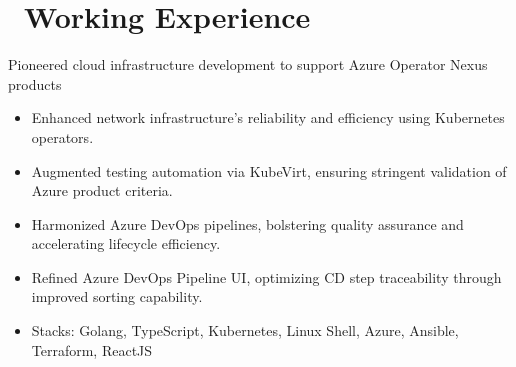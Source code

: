\documentclass{resume}
\begin{document}
\section{\faUsers\ Working Experience}
Pioneered cloud infrastructure development to support Azure Operator Nexus products
\begin{itemize}
  \item Enhanced network infrastructure's reliability and efficiency using Kubernetes operators.
  \item Augmented testing automation via KubeVirt, ensuring stringent validation of Azure product criteria.
  \item Harmonized Azure DevOps pipelines, bolstering quality assurance and accelerating lifecycle efficiency.
  \item Refined Azure DevOps Pipeline UI, optimizing CD step traceability through improved sorting capability.
  \item Stacks: Golang, TypeScript, Kubernetes, Linux Shell, Azure, Ansible, Terraform, ReactJS
\end{itemize}
\end{document}

